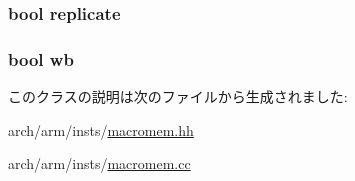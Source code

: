 \label{classArmISA_1_1VldSingleOp64_afb0be420b537599a5b86558127502040}
\hypertarget{classArmISA_1_1VldSingleOp64_a8f2b56ecc4db4f48e2c08aef78591efc}{
\subsubsection[{replicate}]{\setlength{\rightskip}{0pt plus 5cm}bool {\bf replicate}}}
\label{classArmISA_1_1VldSingleOp64_a8f2b56ecc4db4f48e2c08aef78591efc}
\hypertarget{classArmISA_1_1VldSingleOp64_a93541ed16711b2c9c53cf093b675d90b}{
\subsubsection[{wb}]{\setlength{\rightskip}{0pt plus 5cm}bool {\bf wb}}}
\label{classArmISA_1_1VldSingleOp64_a93541ed16711b2c9c53cf093b675d90b}


このクラスの説明は次のファイルから生成されました:\begin{DoxyCompactItemize}
\item 
arch/arm/insts/\hyperlink{macromem_8hh}{macromem.hh}\item 
arch/arm/insts/\hyperlink{macromem_8cc}{macromem.cc}\end{DoxyCompactItemize}
